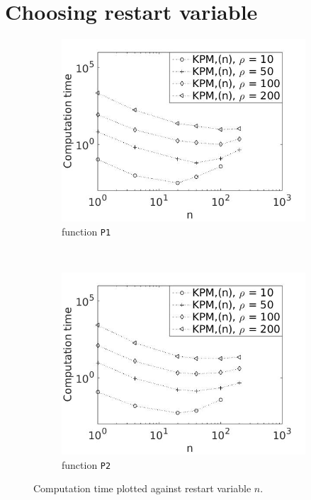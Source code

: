 \section{Choosing restart variable } \label{sec:restvar}
\begin{figure}[H]
        \centering
        \begin{subfigure}[b]{0.45\textwidth}
                \includegraphics[width=\textwidth]{fig/s9rest1}
                \caption{function \texttt{P1}}
                \label{fig:rest1}
        \end{subfigure}
~
        \begin{subfigure}[b]{0.45\textwidth}
                \includegraphics[width=\textwidth]{fig/s10rest2}
                \caption{function \texttt{P2}}
                \label{fig:rest2}
        \end{subfigure}
        \caption{Computation time plotted against restart variable $n$.}\label{fig:rest}
\end{figure}
